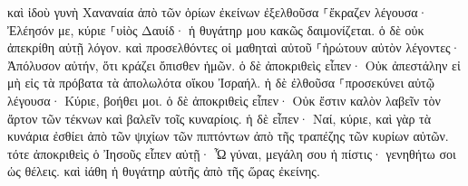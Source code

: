 \documentclass{openreader}
\begin{document}
καὶ ἰδοὺ γυνὴ Χαναναία ἀπὸ τῶν ὁρίων ἐκείνων ἐξελθοῦσα ⸀ἔκραζεν λέγουσα· Ἐλέησόν με, κύριε ⸀υἱὸς Δαυίδ· ἡ θυγάτηρ μου κακῶς δαιμονίζεται. 
ὁ δὲ οὐκ ἀπεκρίθη αὐτῇ λόγον. καὶ προσελθόντες οἱ μαθηταὶ αὐτοῦ ⸀ἠρώτουν αὐτὸν λέγοντες· Ἀπόλυσον αὐτήν, ὅτι κράζει ὄπισθεν ἡμῶν. 
ὁ δὲ ἀποκριθεὶς εἶπεν· Οὐκ ἀπεστάλην εἰ μὴ εἰς τὰ πρόβατα τὰ ἀπολωλότα οἴκου Ἰσραήλ. 
ἡ δὲ ἐλθοῦσα ⸀προσεκύνει αὐτῷ λέγουσα· Κύριε, βοήθει μοι. 
ὁ δὲ ἀποκριθεὶς εἶπεν· Οὐκ ἔστιν καλὸν λαβεῖν τὸν ἄρτον τῶν τέκνων καὶ βαλεῖν τοῖς κυναρίοις. 
ἡ δὲ εἶπεν· Ναί, κύριε, καὶ γὰρ τὰ κυνάρια ἐσθίει ἀπὸ τῶν ψιχίων τῶν πιπτόντων ἀπὸ τῆς τραπέζης τῶν κυρίων αὐτῶν. 
τότε ἀποκριθεὶς ὁ Ἰησοῦς εἶπεν αὐτῇ· Ὦ γύναι, μεγάλη σου ἡ πίστις· γενηθήτω σοι ὡς θέλεις. καὶ ἰάθη ἡ θυγάτηρ αὐτῆς ἀπὸ τῆς ὥρας ἐκείνης. 
\end{document}
